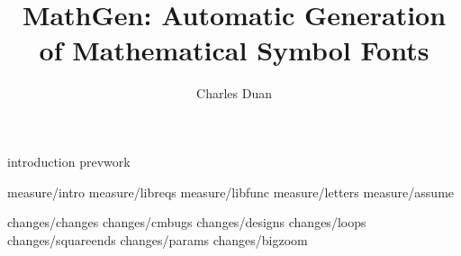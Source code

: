 \documentclass[twocolumn]{article}
\title{MathGen: Automatic Generation of Mathematical Symbol Fonts}
\author{Charles Duan \\ \switchemail{cduan@fas.harvard.edu}}
\def\inputsect#1{\let\sectionname#1}
\begin{document}
\maketitle

\inputsect\section introduction
\inputsect\section prevwork

\inputsect\section measure/intro
\inputsect\subsection measure/libreqs
\inputsect\subsection measure/libfunc
\inputsect\subsection measure/letters
\inputsect\subsection measure/assume

\inputsect\section changes/changes
\inputsect\subsection changes/cmbugs
\inputsect\subsection changes/designs
\inputsect\subsection changes/loops
\inputsect\subsection changes/squareends
\inputsect\subsection changes/params
\inputsect\subsection changes/bigzoom
\end{document}
